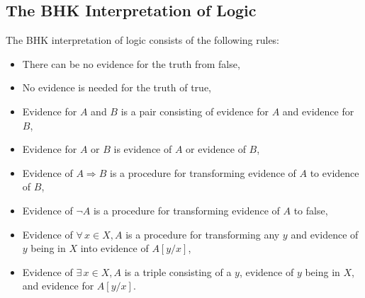 \subsection{The BHK Interpretation of Logic}

The BHK interpretation of logic consists of the following rules:
\begin{itemize}
    \item There can be no evidence for the truth from false,
    \item No evidence is needed for the truth of true,
    \item Evidence for $A$ and $B$ is a pair consisting of evidence
        for $A$ and evidence for $B$,
    \item Evidence for $A$ or $B$ is evidence of $A$ or evidence of $B$,
    \item Evidence of $A \Rightarrow B$ is a procedure for transforming
        evidence of $A$ to evidence of $B$,
    \item Evidence of $\neg A$ is a procedure for transforming evidence
        of $A$ to false,
    \item Evidence of $\forall \, x \in X, A$ is a procedure for transforming
        any $y$ and evidence of $y$ being in $X$ into evidence of $A[y / x]$,
    \item Evidence of $\exists \, x \in X, A$ is a triple consisting of a
        $y$, evidence of $y$ being in $X$, and evidence for $A[y / x]$.
\end{itemize}
